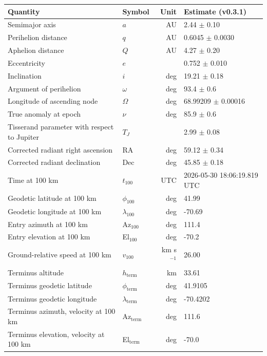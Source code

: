 \begin{tabular}{llrl}
\toprule
Quantity & Symbol & Unit & Estimate {\footnotesize (v0.3.1)} \\
\midrule
Semimajor axis & $a$ & AU & 2.44 $\pm$ 0.10 \\
Perihelion distance & $q$ & AU & 0.6045 $\pm$ 0.0030 \\
Aphelion distance & $Q$ & AU & 4.27 $\pm$ 0.20 \\
Eccentricity & $e$ &  & 0.752 $\pm$ 0.010 \\
Inclination & $i$ & deg & 19.21 $\pm$ 0.18 \\
Argument of perihelion & $\omega$ & deg & 93.4 $\pm$ 0.6 \\
Longitude of ascending node & $\Omega$ & deg & 68.99209 $\pm$ 0.00016 \\
True anomaly at epoch & $\nu$ & deg & 85.9 $\pm$ 0.6 \\
Tisserand parameter with respect to Jupiter & $T_J$ &  & 2.99 $\pm$ 0.08 \\
Corrected radiant right ascension & RA & deg & 59.12 $\pm$ 0.34 \\
Corrected radiant declination & Dec & deg & 45.85 $\pm$ 0.18 \\
Time at 100 km & $t_{100}$ & UTC & 2026-05-30 18:06:19.819 UTC \\
Geodetic latitude at 100 km & $\phi_{100}$ & deg & 41.99 \\
Geodetic longitude at 100 km & $\lambda_{100}$ & deg & -70.69 \\
Entry azimuth at 100 km & Az$_{100}$ & deg & 111.4 \\
Entry elevation at 100 km & El$_{100}$ & deg & -70.2 \\
Ground-relative speed at 100 km & $v_{100}$ & km s$^{-1}$ & 26.00 \\
Terminus altitude & $h_\mathrm{term}$ & km & 33.61 \\
Terminus geodetic latitude & $\phi_\mathrm{term}$ & deg & 41.9105 \\
Terminus geodetic longitude & $\lambda_\mathrm{term}$ & deg & -70.4202 \\
Terminus azimuth, velocity at 100 km & Az$_\mathrm{term}$ & deg & 111.6 \\
Terminus elevation, velocity at 100 km & El$_\mathrm{term}$ & deg & -70.0 \\
\bottomrule
\end{tabular}

